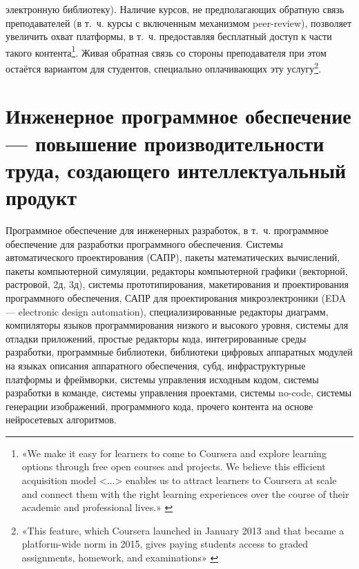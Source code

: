 \documentclass{article}
\begin{document}
электронную библиотеку). Наличие курсов, не предполагающих обратную связь преподавателей (в т.~ч. курсы с включенным механизмом peer-review), позволяет увеличить охват платформы, в т.~ч. предоставляя бесплатный доступ к части такого контента\footnote{«We make it easy for learners to come to Coursera and explore learning options through free open courses and projects. We believe this efficient acquisition model <...> enables us to attract learners to Coursera at scale and connect them with the right learning experiences over the course of their academic and professional lives.» \cite{courseraS1}}. Живая обратная связь со стороны преподавателя при этом остаётся вариантом для студентов, специально оплачивающих эту услугу\footnote{«This feature, which Coursera launched in January 2013 and that became a platform-wide norm in 2015, gives paying students access to graded assignments, homework, and examinations» \cite{howCourseraMakesMoney2022}}.

\section*{Инженерное программное обеспечение — повышение производительности труда, создающего интеллектуальный продукт}

Программное обеспечение для инженерных разработок, в т.~ч. программное обеспечение для разработки программного обеспечения. Системы автоматического проектирования (САПР), пакеты математических вычислений, пакеты компьютерной симуляции, редакторы компьютерной графики (векторной, растровой, 2д, 3д), системы прототипирования, макетирования и проектирования программного обеспечения, САПР для проектирования микроэлектроники (EDA — electronic design automation), специализированные редакторы диаграмм, компиляторы языков программирования низкого и высокого уровня, системы для отладки приложений, простые редакторы кода, интегрированные среды разработки, программные библиотеки, библиотеки цифровых аппаратных модулей на языках описания аппаратного обеспечения, субд, инфраструктурные платформы и фреймворки, системы управления исходным кодом, системы разработки в команде, системы управления проектами, системы no-code, системы генерации изображений, программного кода, прочего контента на основе нейросетевых алгоритмов.
\end{document}
